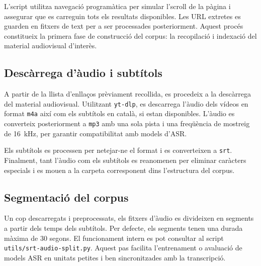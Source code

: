 \documentclass[11pt,a4paper]{article}
\begin{document}
L’script utilitza navegació programàtica per simular l’scroll de la pàgina i assegurar que es carreguin tots els resultats disponibles. Les URL extretes es guarden en fitxers de text per a ser processades posteriorment. Aquest procés constitueix la primera fase de construcció del corpus: la recopilació i indexació del material audiovisual d'interès.

    
\subsection{Descàrrega d'àudio i subtítols}

A partir de la llista d'enllaços prèviament recollida, es procedeix a la descàrrega del material audiovisual. Utilitzant \texttt{yt-dlp}, es descarrega l'àudio dels vídeos en format \texttt{m4a} així com els subtítols en català, si estan disponibles. L’àudio es converteix posteriorment a \texttt{mp3} amb una sola pista i una freqüència de mostreig de 16~kHz, per garantir compatibilitat amb models d’ASR.

Els subtítols es processen per netejar-ne el format i es converteixen a \texttt{srt}. Finalment, tant l’àudio com els subtítols es reanomenen per eliminar caràcters especials i es mouen a la carpeta corresponent dins l’estructura del corpus.

\subsection{Segmentació del corpus}

Un cop descarregats i preprocessats, els fitxers d'àudio es divideixen en segments a partir dels temps dels subtítols.
Per defecte, els segments tenen una durada màxima de 30 segons. El funcionament intern es pot consultar al script \texttt{utils/srt-audio-split.py}. Aquest pas facilita l'entrenament o avaluació de models ASR en unitats petites i ben sincronitzades amb la transcripció.
\end{document}
